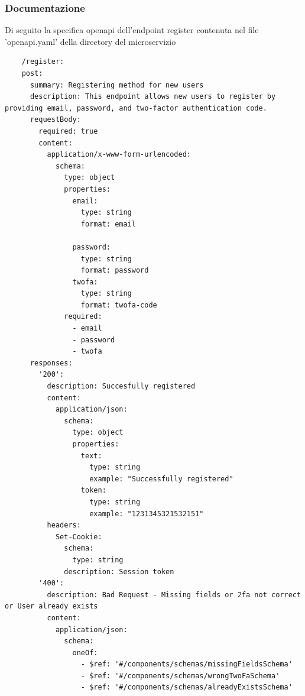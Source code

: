 \documentclass{report}
\begin{document}
\subsubsection*{Documentazione}
Di seguito la specifica openapi dell'endpoint register contenuta nel file 'openapi.yaml' della directory del microservizio
\begin{verbatim}
	/register:
    post:
      summary: Registering method for new users
      description: This endpoint allows new users to register by providing email, password, and two-factor authentication code.
      requestBody:
        required: true
        content:
          application/x-www-form-urlencoded:
            schema:
              type: object
              properties:
                email:
                  type: string
                  format: email
                  
                password:
                  type: string
                  format: password
                twofa:
                  type: string
                  format: twofa-code
              required:
                - email
                - password
                - twofa
      responses:
        '200':
          description: Succesfully registered
          content:
            application/json:
              schema:
                type: object
                properties:
                  text:
                    type: string
                    example: "Successfully registered"
                  token:
                    type: string
                    example: "1231345321532151"
          headers:
            Set-Cookie:
              schema:
                type: string
              description: Session token
        '400':
          description: Bad Request - Missing fields or 2fa not correct or User already exists
          content:
            application/json:
              schema:
                oneOf:
                  - $ref: '#/components/schemas/missingFieldsSchema'
                  - $ref: '#/components/schemas/wrongTwoFaSchema'
                  - $ref: '#/components/schemas/alreadyExistsSchema'

\end{verbatim}
\end{document}
